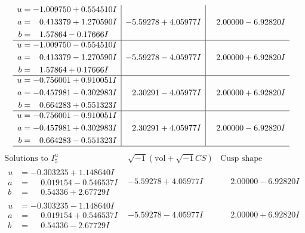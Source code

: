 \documentclass[1p]{elsarticle_modified}
\theoremstyle{definition}
\newcommand{\I}{\sqrt{-1}}
\begin{document}
$$\begin{array}{c|c|c}
\begin{aligned}
u &= -1.009750 + 0.554510 I \\
a &= \phantom{-}0.413379 + 1.270590 I \\
b &= \phantom{-}1.57864 - 0.17666 I\end{aligned}
 & -5.59278 + 4.05977 I & \phantom{-}2.00000 - 6.92820 I \\ \hline\begin{aligned}
u &= -1.009750 - 0.554510 I \\
a &= \phantom{-}0.413379 - 1.270590 I \\
b &= \phantom{-}1.57864 + 0.17666 I\end{aligned}
 & -5.59278 - 4.05977 I & \phantom{-}2.00000 + 6.92820 I \\ \hline\begin{aligned}
u &= -0.756001 + 0.910051 I \\
a &= -0.457981 - 0.302983 I \\
b &= \phantom{-}0.664283 + 0.551323 I\end{aligned}
 & \phantom{-}2.30291 - 4.05977 I & \phantom{-}2.00000 + 6.92820 I \\ \hline\begin{aligned}
u &= -0.756001 - 0.910051 I \\
a &= -0.457981 + 0.302983 I \\
b &= \phantom{-}0.664283 - 0.551323 I\end{aligned}
 & \phantom{-}2.30291 + 4.05977 I & \phantom{-}2.00000 - 6.92820 I\\
 \hline 
 \end{array}$$\newpage$$\begin{array}{c|c|c}  
\text{Solutions to }I^u_{5}& \I (\text{vol} + \sqrt{-1}CS) & \text{Cusp shape}\\
 \hline 
\begin{aligned}
u &= -0.303235 + 1.148640 I \\
a &= \phantom{-}0.019154 - 0.546537 I \\
b &= \phantom{-}0.54336 + 2.67729 I\end{aligned}
 & -5.59278 + 4.05977 I & \phantom{-}2.00000 - 6.92820 I \\ \hline\begin{aligned}
u &= -0.303235 - 1.148640 I \\
a &= \phantom{-}0.019154 + 0.546537 I \\
b &= \phantom{-}0.54336 - 2.67729 I\end{aligned}
 & -5.59278 - 4.05977 I & \phantom{-}2.00000 + 6.92820 I \\ \hline\begin{aligned}

\end{aligned}
\end{array}$$
\end{document}
